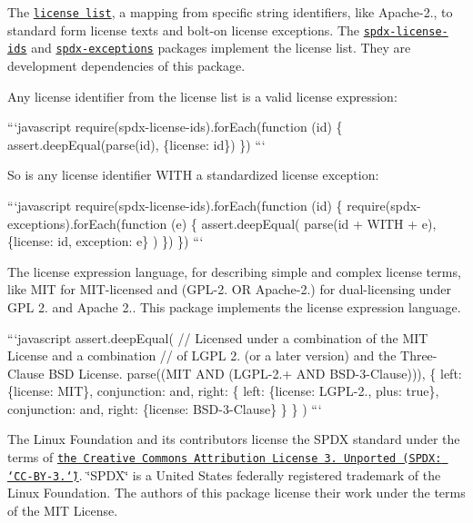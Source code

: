 \begin{DoxyEnumerate}
\item The \href{https://spdx.org/licenses}{\tt license list}, a mapping from specific string identifiers, like {\ttfamily Apache-\/2.}, to standard form license texts and bolt-\/on license exceptions. The \href{https://www.npmjs.com/package/spdx-exceptions}{\tt spdx-\/license-\/ids} and \href{https://www.npmjs.com/package/spdx-license-ids}{\tt spdx-\/exceptions} packages implement the license list. They are development dependencies of this package.

Any license identifier from the license list is a valid license expression\+:

```javascript require(\textquotesingle{}spdx-\/license-\/ids\textquotesingle{}).for\+Each(function (id) \{ assert.\+deep\+Equal(parse(id), \{license\+: id\}) \}) ```

So is any license identifier {\ttfamily W\+I\+TH} a standardized license exception\+:

```javascript require(\textquotesingle{}spdx-\/license-\/ids\textquotesingle{}).for\+Each(function (id) \{ require(\textquotesingle{}spdx-\/exceptions\textquotesingle{}).for\+Each(function (e) \{ assert.\+deep\+Equal( parse(id + \textquotesingle{} W\+I\+TH \textquotesingle{} + e), \{license\+: id, exception\+: e\} ) \}) \}) ```
\item The license expression language, for describing simple and complex license terms, like {\ttfamily M\+IT} for M\+I\+T-\/licensed and {\ttfamily (G\+P\+L-\/2. OR Apache-\/2.)} for dual-\/licensing under G\+PL 2. and Apache 2.. This package implements the license expression language.

```javascript assert.\+deep\+Equal( // Licensed under a combination of the M\+IT License and a combination // of L\+G\+PL 2. (or a later version) and the Three-\/\+Clause B\+SD License. parse(\textquotesingle{}(M\+IT A\+ND (L\+G\+P\+L-\/2.+ A\+ND B\+S\+D-\/3-\/\+Clause))\textquotesingle{}), \{ left\+: \{license\+: \textquotesingle{}M\+IT\textquotesingle{}\}, conjunction\+: \textquotesingle{}and\textquotesingle{}, right\+: \{ left\+: \{license\+: \textquotesingle{}L\+G\+P\+L-\/2.\textquotesingle{}, plus\+: true\}, conjunction\+: \textquotesingle{}and\textquotesingle{}, right\+: \{license\+: \textquotesingle{}B\+S\+D-\/3-\/\+Clause\textquotesingle{}\} \} \} ) ```
\end{DoxyEnumerate}

The Linux Foundation and its contributors license the S\+P\+DX standard under the terms of \href{http://spdx.org/licenses/CC-BY-3.0}{\tt the Creative Commons Attribution License 3. Unported (S\+P\+D\+X\+: \char`\"{}\+C\+C-\/\+B\+Y-\/3.\char`\"{})}. \char`\"{}\+S\+P\+D\+X\char`\"{} is a United States federally registered trademark of the Linux Foundation. The authors of this package license their work under the terms of the M\+IT License. 